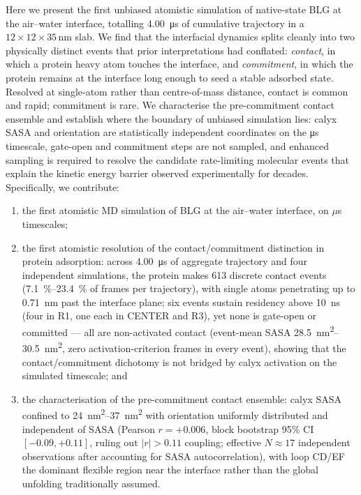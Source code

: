 \documentclass[11pt,a4paper]{article}
\begin{document}
Here we present the first unbiased atomistic simulation of native-state BLG
at the air--water interface, totalling \SI{4.00}{\micro\second} of
cumulative trajectory in a $12\times12\times35$\,\si{\nano\metre} slab. We find that
the interfacial dynamics splits cleanly into two physically distinct events
that prior interpretations had conflated: \emph{contact}, in which a
protein heavy atom touches the interface, and \emph{commitment}, in which
the protein remains at the interface long enough to seed a stable
adsorbed state. Resolved at single-atom rather than centre-of-mass
distance, contact is common and rapid; commitment is rare. We characterise the
pre-commitment contact ensemble and establish where the boundary of
unbiased simulation lies: calyx SASA and orientation are statistically
independent coordinates on the \si{\micro\second} timescale, gate-open
and commitment steps are not sampled, and enhanced sampling is required
to resolve the candidate rate-limiting molecular events that explain the
kinetic energy barrier observed experimentally for decades. Specifically,
we contribute:
\begin{enumerate}
  \item the first atomistic MD simulation of BLG at the air--water interface,
        on $\mu$s timescales;
  \item the first atomistic resolution of the contact/commitment
        distinction in protein adsorption: across \SI{4.00}{\micro\second}
        of aggregate trajectory and four independent simulations, the
        protein makes \num{613} discrete contact events
        (\SIrange{7.1}{23.4}{\percent} of frames per trajectory), with
        single atoms penetrating up to \SI{0.71}{\nano\metre} past the
        interface plane; six events sustain residency above
        \SI{10}{\nano\second} (four in R1, one each in CENTER and R3),
        yet none is gate-open or committed --- all are non-activated
        contact (event-mean SASA \SIrange{28.5}{30.5}{\nano\metre\squared},
        zero activation-criterion frames in every event), showing that
        the contact/commitment dichotomy is not bridged by calyx
        activation on the simulated timescale; and
  \item the characterisation of the pre-commitment contact ensemble:
        calyx SASA confined to \SIrange{24}{37}{\nano\metre\squared}
        with orientation uniformly distributed and independent of SASA
        (Pearson $r = +0.006$, block bootstrap 95\% CI $[-0.09, +0.11]$,
        ruling out $|r| > 0.11$ coupling; effective $N \approx 17$
        independent observations after accounting for SASA autocorrelation),
        with loop CD/EF the dominant flexible region near the interface
        rather than the global unfolding traditionally assumed.
\end{enumerate}
\end{document}

